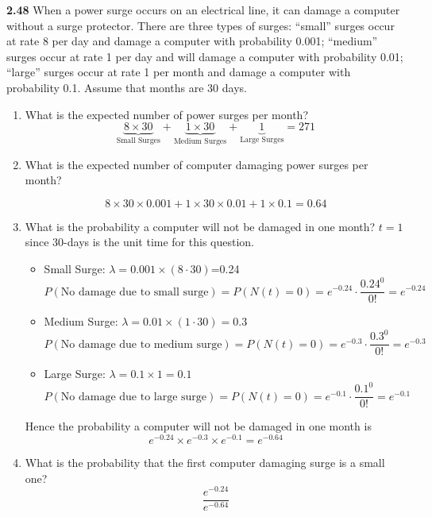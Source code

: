 \documentclass[12pt]{article}
\begin{document}
\newpage
{\bf 2.48 } When a power surge occurs on an electrical line, it can damage a computer without a surge protector. There are three types of surges: “small” surges occur at rate 8 per day and damage a computer with probability 0.001; “medium” surges occur at rate 1 per day and will damage a computer with probability 0.01; “large” surges occur at rate 1 per month and damage a computer with probability 0.1. Assume that months are 30 days.
\begin{enumerate}[label=(\alph*)]
    \item What is the expected number of power surges per month?
    $$\underbrace{8\times 30}_{\text{Small Surges}} + \underbrace{1\times 30}_{\text{Medium Surges}} + \underbrace{1}_{\text{Large Surges}} = 271$$
    
    \item What is the expected number of computer damaging power surges per month?
    
    $$8\times 30\times 0.001 + 1\times 30\times 0.01 + 1\times 0.1 = 0.64$$
    \item What is the probability a computer will not be damaged in one month?
    $t=1$ since 30-days is the unit time for this question.
    \begin{itemize}
        \item Small Surge: $\lambda = 0.001\times (8\cdot 30)$=0.24
        $$P(\text{No damage due to small surge})=P(N(t)=0) = e^{-0.24}\cdot \frac{0.24^0}{0!}=e^{-0.24}$$
        
        \item Medium Surge: $\lambda = 0.01\times (1\cdot 30) = 0.3$
        $$P(\text{No damage due to medium surge})=P(N(t)=0) = e^{-0.3}\cdot \frac{0.3^0}{0!}=e^{-0.3}$$
        
        \item Large Surge: $\lambda = 0.1\times 1 = 0.1$
        $$P(\text{No damage due to large surge})=P(N(t)=0) = e^{-0.1}\cdot \frac{0.1^0}{0!}=e^{-0.1}$$
    \end{itemize}
    
    Hence the probability a computer will not be damaged in one month is
    $$e^{-0.24}\times e^{-0.3}\times e^{-0.1}=e^{-0.64}$$
    
    \item What is the probability that the first computer damaging surge is a small one?
    $$\frac{e^{-0.24}}{e^{-0.64}}$$
    
\end{enumerate}
\end{document}
